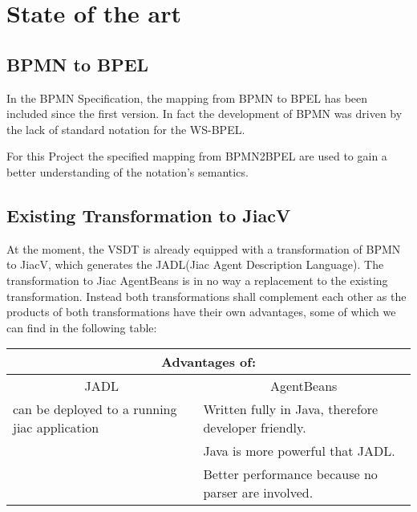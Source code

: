 \chapter{State of the art}

\section{BPMN to BPEL}
In the BPMN Specification, the mapping from BPMN to BPEL has been included since the first version. In fact the development of BPMN was driven by the lack of standard notation for the WS-BPEL\cite{weidlich2008}. 


For this Project the specified mapping from BPMN2BPEL are used to gain a better understanding of the notation's semantics.


\section{Existing Transformation to JiacV}
At the moment, the VSDT is already equipped with a transformation of BPMN to JiacV, which generates the JADL(Jiac Agent Description Language).
The transformation to Jiac AgentBeans is in no way a replacement to the existing transformation. Instead both transformations shall complement each other as the products of both transformations have their own advantages, some of which we can find in the following table:
\begin{table}[htbp]
	\centering
		\begin{tabularx}{\linewidth}{|l|X|}\hline\hline
			\multicolumn{2}{|c|}{\textbf{Advantages of:}} \\\hline
			\multicolumn{1}{|c|}{JADL} & \multicolumn{1}{c|}{AgentBeans}\\\hline
			can be deployed to a running jiac application &  Written fully in Java, therefore developer friendly.\\
																										&  Java is more powerful that JADL.\\
			                           										&  Better performance because no parser are involved.\\\hline\hline
		\end{tabularx}
\end{table}

